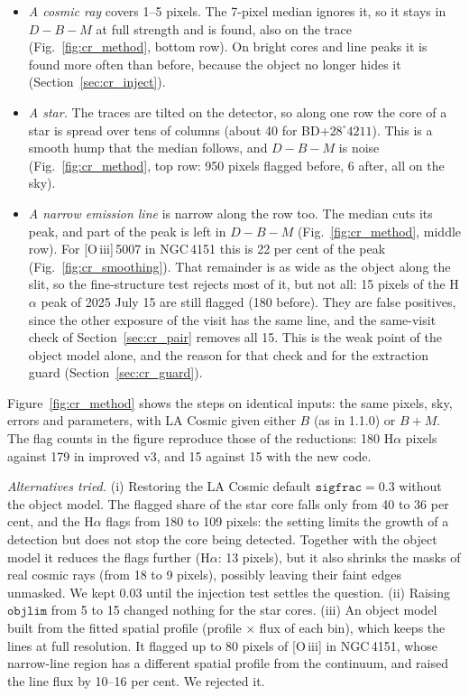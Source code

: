 \begin{itemize}
\item \textit{A cosmic ray} covers 1--5 pixels. The 7-pixel median ignores it, so it stays in $D-B-M$ at full strength
and is found, also on the trace (Fig.~\ref{fig:cr_method}, bottom row). On bright cores and line peaks it is found
more often than before, because the object no longer hides it (Section~\ref{sec:cr_inject}).
\item \textit{A star.} The traces are tilted on the detector, so along one row the core of a star is spread over tens
of columns (about 40 for BD$+28^\circ4211$). This is a smooth hump that the median follows, and $D-B-M$ is noise
(Fig.~\ref{fig:cr_method}, top row: 950 pixels flagged before, 6 after, all on the sky).
\item \textit{A narrow emission line} is narrow along the row too. The median cuts its peak, and part of the peak is
left in $D-B-M$ (Fig.~\ref{fig:cr_method}, middle row). For [O\,{\sc iii}]\,5007 in NGC\,4151 this is 22 per cent of
the peak (Fig.~\ref{fig:cr_smoothing}). That remainder is as wide as the object along the slit, so the fine-structure
test rejects most of it, but not all: 15 pixels of the H$\alpha$ peak of 2025 July 15 are still flagged (180 before).
They are false positives, since the other exposure of the visit has the same line, and the same-visit check of
Section~\ref{sec:cr_pair} removes all 15. This is the weak point of the object model alone, and the reason for that
check and for the extraction guard (Section~\ref{sec:cr_guard}).
\end{itemize}
Figure~\ref{fig:cr_method} shows the steps on identical inputs: the same pixels, sky, errors and parameters, with LA
Cosmic given either $B$ (as in 1.1.0) or $B+M$. The flag counts in the figure reproduce those of the reductions: 180
H$\alpha$ pixels against 179 in improved v3, and 15 against 15 with the new code.

\textit{Alternatives tried.}
(i) Restoring the LA Cosmic default $\texttt{sigfrac}=0.3$ without the object model. The flagged share of the star core
falls only from 40 to 36 per cent, and the H$\alpha$ flags from 180 to 109 pixels: the setting limits the growth of a
detection but does not stop the core being detected. Together with the object model it reduces the flags further
(H$\alpha$: 13 pixels), but it also shrinks the masks of real cosmic rays (from 18 to 9 pixels), possibly leaving their
faint edges unmasked. We kept 0.03 until the injection test settles the question.
(ii) Raising $\texttt{objlim}$ from 5 to 15 changed nothing for the star cores.
(iii) An object model built from the fitted spatial profile (profile $\times$ flux of each bin), which keeps the lines
at full resolution. It flagged up to 80 pixels of [O\,{\sc iii}] in NGC\,4151, whose narrow-line region has a
different spatial profile from the continuum, and raised the line flux by 10--16 per cent. We rejected it.


